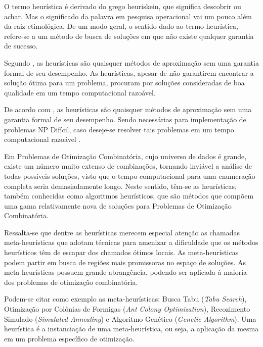 \documentclass{abntpuc}
\begin{document}
%
%
%





O termo heurística é derivado do grego heuriskein, que significa descobrir ou achar. Mas o significado da 
palavra em pesquisa operacional vai um pouco além da raiz etimológica. De um modo geral, o sentido dado ao termo heurística, refere-se a um método de busca de soluções em que não existe qualquer garantia de sucesso.\par


Segundo \cite{steiglitz1982combinatorial}, as heurísticas são quaisquer métodos de 
aproximação sem uma garantia formal de seu desempenho. As heurísticas, apesar de não garantirem encontrar a solução ótima para um problema, procuram por soluções consideradas de boa qualidade em um tempo computacional razoável.\par

De acordo com \cite{steiglitz1982combinatorial}, as heurísticas são quaisquer métodos de aproximação sem uma garantia formal de seu desempenho. Sendo necessárias para implementação de problemas NP Difícil, caso deseje-se resolver tais problemas em um tempo computacional razoável \cite{evans1992optimization}.\par



\cite{deleonardo} Em Problemas de Otimização Combinatória, cujo universo de dados é grande, existe um número muito extenso de combinações, tornando inviável a análise de todas possíveis soluções, visto que o tempo computacional para uma enumeração completa seria demasiadamente longo. Neste sentido, têm-se as heurísticas, também conhecidas como algoritmos heurísticos, que são métodos que compõem uma gama relativamente nova de soluções para Problemas de Otimização Combinatória. 


Ressalta-se que dentre as heurísticas merecem especial atenção as chamadas meta-heurísticas que adotam técnicas para amenizar a dificuldade que os métodos heurísticos têm de escapar dos chamados ótimos locais. As meta-heurísticas podem partir em busca de regiões mais promissoras no espaço de soluções. As meta-heurísticas possuem grande abrangência, podendo ser aplicada à maioria dos problemas de otimização combinatória.\par

Podem-se citar como exemplo as meta-heurísticas: Busca Tabu (\textit{Tabu Search}), Otimização por Colônias de Formigas (\textit{Ant Colony Optimization}), Recozimento Simulado (\textit{Simulated Annealing}) e Algoritmo Genético (\textit{Genetic Algorithm}). Uma heurística é a instanciação de uma meta-heurística, ou seja, a aplicação da mesma em um problema específico de otimização.\par



%
%
%
%
\end{document}
